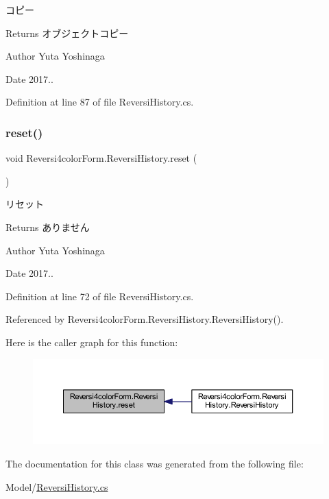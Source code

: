 コピー 

\begin{DoxyReturn}{Returns}
オブジェクトコピー 
\end{DoxyReturn}
\begin{DoxyAuthor}{Author}
Yuta Yoshinaga 
\end{DoxyAuthor}
\begin{DoxyDate}{Date}
2017.. 
\end{DoxyDate}


Definition at line 87 of file Reversi\+History.\+cs.

\mbox{\label{class_reversi4color_form_1_1_reversi_history_a32bee2391a72697e8f9eb68542b70e62}} 
\subsubsection{\texorpdfstring{reset()}{reset()}}
{\footnotesize\ttfamily void Reversi4color\+Form.\+Reversi\+History.\+reset (\begin{DoxyParamCaption}{ }\end{DoxyParamCaption})}



リセット 

\begin{DoxyReturn}{Returns}
ありません 
\end{DoxyReturn}
\begin{DoxyAuthor}{Author}
Yuta Yoshinaga 
\end{DoxyAuthor}
\begin{DoxyDate}{Date}
2017.. 
\end{DoxyDate}


Definition at line 72 of file Reversi\+History.\+cs.



Referenced by Reversi4color\+Form.\+Reversi\+History.\+Reversi\+History().

Here is the caller graph for this function\+:\nopagebreak
\begin{figure}[H]
\begin{center}
\leavevmode
\includegraphics[width=350pt]{class_reversi4color_form_1_1_reversi_history_a32bee2391a72697e8f9eb68542b70e62_icgraph}
\end{center}
\end{figure}


The documentation for this class was generated from the following file\+:\begin{DoxyCompactItemize}
\item 
Model/\hyperlink{_reversi_history_8cs}{Reversi\+History.\+cs}\end{DoxyCompactItemize}
